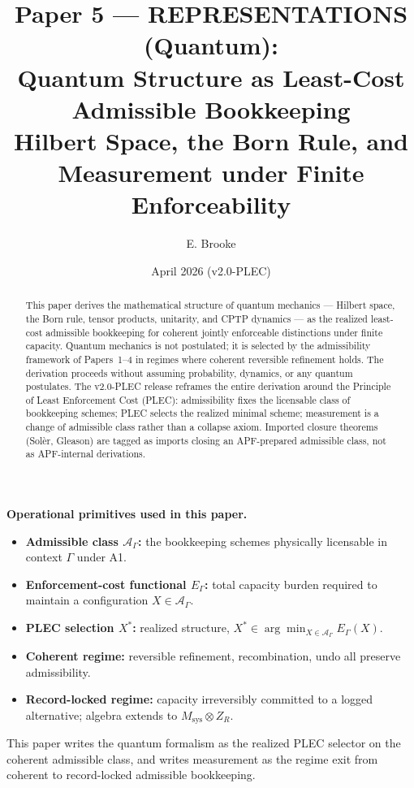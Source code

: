 \documentclass[11pt]{article}
\title{Paper 5 --- REPRESENTATIONS (Quantum):\\
Quantum Structure as Least-Cost Admissible Bookkeeping\\[2pt]
\large Hilbert Space, the Born Rule, and Measurement under Finite Enforceability}
\author{E. Brooke}
\date{April 2026 (v2.0-PLEC)}
\begin{document}
\maketitle

\begin{abstract}
This paper derives the mathematical structure of quantum mechanics --- Hilbert space,
the Born rule, tensor products, unitarity, and CPTP dynamics --- as the realized
least-cost admissible bookkeeping for coherent jointly enforceable distinctions under
finite capacity. Quantum mechanics is not postulated; it is selected by the
admissibility framework of Papers~1--4 in regimes where coherent reversible refinement
holds. The derivation proceeds without assuming probability, dynamics, or any quantum
postulates. The v2.0-PLEC release reframes the entire derivation around the Principle
of Least Enforcement Cost (PLEC): admissibility fixes the licensable class of
bookkeeping schemes; PLEC selects the realized minimal scheme; measurement is a
change of admissible class rather than a collapse axiom. Imported closure theorems
(Sol\`er, Gleason) are tagged as imports closing an APF-prepared admissible class,
not as APF-internal derivations.
\end{abstract}

\begin{wayfinder}
\textbf{Operational primitives used in this paper.}
\begin{itemize}[leftmargin=1.5em,nosep]
    \item \textbf{Admissible class $\mathcal{A}_{\Gamma}$:} the bookkeeping schemes
    physically licensable in context $\Gamma$ under A1.
    \item \textbf{Enforcement-cost functional $E_{\Gamma}$:} total capacity burden
    required to maintain a configuration $X \in \mathcal{A}_{\Gamma}$.
    \item \textbf{PLEC selection $X^{\ast}$:} realized structure, $X^{\ast} \in
    \arg\min_{X \in \mathcal{A}_{\Gamma}} E_{\Gamma}(X)$.
    \item \textbf{Coherent regime:} reversible refinement, recombination, undo all
    preserve admissibility.
    \item \textbf{Record-locked regime:} capacity irreversibly committed to a logged
    alternative; algebra extends to $M_{\mathrm{sys}} \otimes Z_R$.
\end{itemize}
This paper writes the quantum formalism as the realized PLEC selector on the coherent
admissible class, and writes measurement as the regime exit from coherent to
record-locked admissible bookkeeping.
\end{wayfinder}
\end{document}
